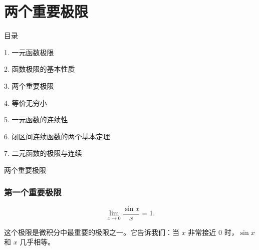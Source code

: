 \documentclass[aspectratio=169,10pt,fontset=fandol]{ctexbeamer}
\newenvironment{custom}[1]{\par\noindent\textbf{#1}\quad}{\par\vspace{0.8em}}
\begin{document}
\section{两个重要极限}
\begin{frame}[t,fragile]{目录}
\normalsize
{\color{black}\normalsize 1. 一元函数极限\par}\vspace{0.22em}
{\color{black}\normalsize 2. 函数极限的基本性质\par}\vspace{0.22em}
{\color{blue}\normalsize 3. 两个重要极限\par}\vspace{0.22em}
{\color{gray!40}\normalsize 4. 等价无穷小\par}\vspace{0.22em}
{\color{gray!40}\normalsize 5. 一元函数的连续性\par}\vspace{0.22em}
{\color{gray!40}\normalsize 6. 闭区间连续函数的两个基本定理\par}\vspace{0.22em}
{\color{gray!40}\normalsize 7. 二元函数的极限与连续\par}\vspace{0.22em}
\end{frame}
\begin{frame}[t,fragile]{两个重要极限}
\normalsize
{\normalsize
\subsubsection*{第一个重要极限}




}
{\normalsize
\[

\lim_{x \to 0} \frac{\sin x}{x} = 1.

\]




}
{\normalsize
这个极限是微积分中最重要的极限之一。它告诉我们：当 \(x\) 非常接近 0 时，\(\sin x\) 和 \(x\) 几乎相等。




}
\end{frame}
\end{document}
